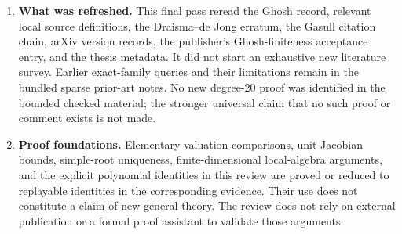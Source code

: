 \documentclass[
  british,
  10pt,
]{article}
\begin{document}
\begin{enumerate}
  predecessor's unresolved-C status are superseded by
  \href{evidence/seven-terms/PROOF.md}{the seven-term proof}. Earlier
  arithmetic is not silently rewritten.
\item
  \textbf{What was refreshed.} This final pass reread the Ghosh record,
  relevant local source definitions, the Draisma--de Jong erratum, the
  Gasull citation chain, arXiv version records, the publisher's
  Ghosh-finiteness acceptance entry, and the thesis metadata. It did not
  start an exhaustive new literature survey. Earlier exact-family
  queries and their limitations remain in the bundled sparse prior-art
  notes. No new degree-20 proof was identified in the bounded checked
  material; the stronger universal claim that no such proof or comment
  exists is not made.
\item
  \textbf{Proof foundations.} Elementary valuation comparisons,
  unit-Jacobian bounds, simple-root uniqueness, finite-dimensional
  local-algebra arguments, and the explicit polynomial identities in
  this review are proved or reduced to replayable identities in the
  corresponding evidence. Their use does not constitute a claim of new
  general theory. The review does not rely on external publication or a
  formal proof assistant to validate those arguments.
\end{enumerate}
\end{document}
